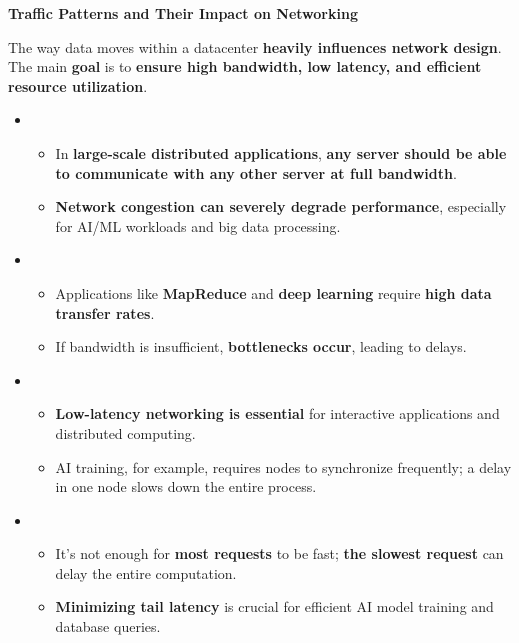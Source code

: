 \begin{flushleft}
    \textcolor{Red2}{ \textbf{Traffic Patterns and Their Impact on Networking}}
\end{flushleft}
The way data moves within a datacenter \textbf{heavily influences network design}. The main \textbf{goal} is to \textbf{ensure high bandwidth, low latency, and efficient resource utilization}.
\begin{itemize}
    \item {}
    \begin{itemize}
        \item In \textbf{large-scale distributed applications}, \textbf{any server should be able to communicate with any other server at full bandwidth}.
        \item \textbf{Network congestion can severely degrade performance}, especially for AI/ML workloads and big data processing.
    \end{itemize}
    \item {}
    \begin{itemize}
        \item Applications like \textbf{MapReduce} and \textbf{deep learning} require \textbf{high data transfer rates}.
        \item If bandwidth is insufficient, \textbf{bottlenecks occur}, leading to delays.
    \end{itemize}
    \item {}
    \begin{itemize}
        \item \textbf{Low-latency networking is essential} for interactive applications and distributed computing.
        \item AI training, for example, requires nodes to synchronize frequently; a delay in one node slows down the entire process.
    \end{itemize}
    \item {}
    \begin{itemize}
        \item It's not enough for \textbf{most requests} to be fast; \textbf{the slowest request} can delay the entire computation.
        \item \textbf{Minimizing tail latency} is crucial for efficient AI model training and database queries.
    \end{itemize}
\end{itemize}

